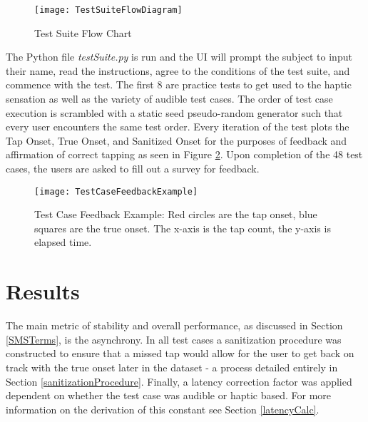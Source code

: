 \begin{figure}[H]
    \centering
    \texttt{[image: TestSuiteFlowDiagram]}
    \caption{Test Suite Flow Chart}
    \label{fig:TestSuiteFlowDiagram}
\end{figure}

The Python file \textit{testSuite.py} is run and the UI will prompt the subject to input their name, read the instructions, agree to the conditions of the test suite, and commence with the test. The first 8 are practice tests to get used to the haptic sensation as well as the variety of audible test cases. The order of test case execution is scrambled with a static seed pseudo-random generator such that every user encounters the same test order. Every iteration of the test plots the Tap Onset, True Onset, and Sanitized Onset  for the purposes of feedback and affirmation of correct tapping as seen in Figure \ref{fig:TestCaseFeedbackEx}. Upon completion of the 48 test cases, the users are asked to fill out a survey for feedback.

\begin{figure}[H]
    \centering
    \texttt{[image: TestCaseFeedbackExample]}
    \caption{Test Case Feedback Example: Red circles are the tap onset, blue squares are the true onset. The x-axis is the tap count, the y-axis is elapsed time.}
    \label{fig:TestCaseFeedbackEx}
\end{figure}

\section{Results}\label{Results}
The main metric of stability and overall performance, as discussed in Section \ref{SMSTerms}, is the asynchrony. In all test cases a sanitization procedure was constructed to ensure that a missed tap would allow for the user to get back on track with the true onset later in the dataset - a process detailed entirely in Section \ref{sanitizationProcedure}. Finally, a latency correction factor was applied dependent on whether the test case was audible or haptic based. For more information on the derivation of this constant see Section \ref{latencyCalc}.

